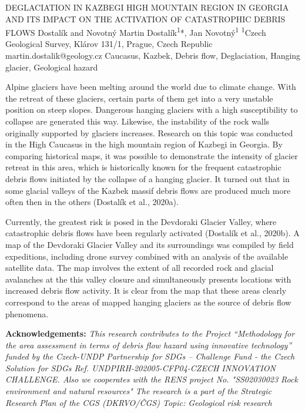 
\abstract
{DEGLACIATION IN KAZBEGI HIGH MOUNTAIN REGION IN GEORGIA AND ITS IMPACT ON THE ACTIVATION OF CATASTROPHIC DEBRIS FLOWS} 
{Dostalík and Novotný} 
{Martin Dostalík\textsuperscript{1}*, Jan Novotný\textsuperscript{1}} 
{\KLtag} 
{
\textsuperscript{1}Czech Geological Survey, Klárov 131/1, Prague, Czech Republic
}
{martin.dostalik@geology.cz}  %
{Caucasus, Kazbek, Debris flow, Deglaciation, Hanging glacier, Geological hazard}
{Alpine glaciers have been melting around the world due to climate change. With the retreat of these glaciers, certain parts of them get into a very unstable position on steep slopes. Dangerous hanging glaciers with a high susceptibility to collapse are generated this way. Likewise, the instability of the rock walls originally supported by glaciers increases. 
Research on this topic was conducted in the High Caucasus in the high mountain region of Kazbegi in Georgia. By comparing historical maps, it was possible to demonstrate the intensity of glacier retreat in this area, which is historically known for the frequent catastrophic debris flows initiated by the collapse of a hanging glacier. It turned out that in some glacial valleys of the Kazbek massif debris flows are produced much more often then in the others (Dostalík et al., 2020a). 

Currently, the greatest risk is posed in the Devdoraki Glacier Valley, where catastrophic debris flows have been regularly activated (Dostalík et al., 2020b). A map of the Devdoraki Glacier Valley and its surroundings was compiled by field expeditions, including drone survey combined with an analysis of the available satellite data. The map involves the extent of all recorded rock and glacial avalanches at the this valley closure and simultaneously presents locations with increased debris flow activity. It is clear from the map that these areas clearly correspond to the areas of mapped hanging glaciers as the source of debris flow phenomena.

\noindent
\textbf{Acknowledgements:}
\textit{This research contributes to the Project “Methodology for the area assessment in terms of debris flow hazard using innovative technology” funded by the Czech-UNDP Partnership for SDGs – Challenge Fund - the Czech Solution for SDGs Ref. UNDPIRH-202005-CFP04-CZECH INNOVATION CHALLENGE. 
Also we cooperates with the RENS project No. "SS02030023 Rock environment and natural resources" 
The research is a part of the Strategic Research Plan of the CGS (DKRVO/ČGS) Topic: Geological risk research}
}
